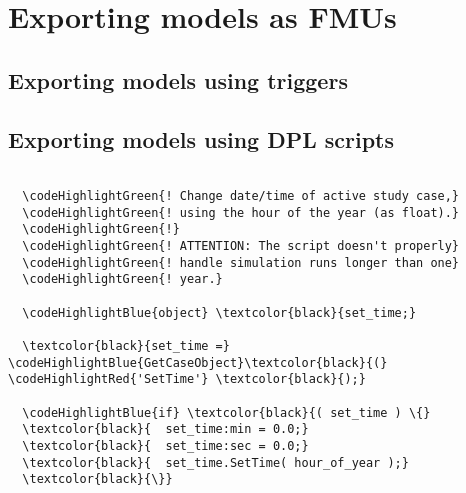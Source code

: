 \chapter{Exporting \pf models as FMUs}


\section{Exporting models using triggers}


\section{Exporting models using DPL scripts}



\begin{Verbatim}[frame=single,commandchars=\\\{\}]

  \codeHighlightGreen{! Change date/time of active study case,}
  \codeHighlightGreen{! using the hour of the year (as float).}
  \codeHighlightGreen{!}
  \codeHighlightGreen{! ATTENTION: The script doesn't properly}
  \codeHighlightGreen{! handle simulation runs longer than one}
  \codeHighlightGreen{! year.}

  \codeHighlightBlue{object} \textcolor{black}{set_time;}

  \textcolor{black}{set_time =} \codeHighlightBlue{GetCaseObject}\textcolor{black}{(} \codeHighlightRed{'SetTime'} \textcolor{black}{);}

  \codeHighlightBlue{if} \textcolor{black}{( set_time ) \{}
  \textcolor{black}{  set_time:min = 0.0;}
  \textcolor{black}{  set_time:sec = 0.0;}
  \textcolor{black}{  set_time.SetTime( hour_of_year );}
  \textcolor{black}{\}}

\end{Verbatim}
